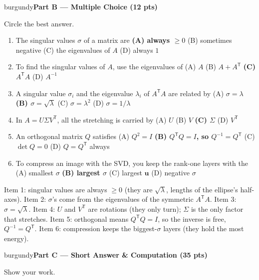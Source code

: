 \documentclass[10pt]{article}
\newcommand{\uu}{\mathbf{u}}
\newcommand{\T}{^{\mathsf T}}
\newcommand{\parthead}[1]{%
  \vspace{6pt}\noindent
  \begin{headlinebox}{burgundy}{\color{white}\bfseries #1}\end{headlinebox}%
  \vspace{4pt}}
\begin{document}
\parthead{Part B --- Multiple Choice (12 pts)}
Circle the best answer.

\begin{enumerate}[leftmargin=1.9em, itemsep=9pt]
  \item The singular values $\sigma$ of a matrix are
    \hfill \textbf{(A) always $\ge0$} \ans{$\leftarrow$} \quad (B) sometimes negative \quad (C) the eigenvalues of $A$ \quad (D) always $1$
  \item To find the singular values of $A$, use the eigenvalues of
    \hfill (A) $A$ \quad (B) $A+A\T$ \quad \textbf{(C) $A\T A$} \ans{$\leftarrow$} \quad (D) $A^{-1}$
  \item A singular value $\sigma_i$ and the eigenvalue $\lambda_i$ of $A\T A$ are related by
    \hfill (A) $\sigma=\lambda$ \quad \textbf{(B) $\sigma=\sqrt{\lambda}$} \ans{$\leftarrow$} \quad (C) $\sigma=\lambda^2$ \quad (D) $\sigma=1/\lambda$
  \item In $A=U\Sigma V\T$, all the stretching is carried by
    \hfill (A) $U$ \quad (B) $V$ \quad \textbf{(C) $\Sigma$} \ans{$\leftarrow$} \quad (D) $V\T$
  \item An orthogonal matrix $Q$ satisfies
    \hfill (A) $Q^2=I$ \quad \textbf{(B) $Q\T Q=I$, so $Q^{-1}=Q\T$} \ans{$\leftarrow$} \quad (C) $\det Q=0$ \quad (D) $Q=Q\T$ always
  \item To compress an image with the SVD, you keep the rank-one layers with the
    \hfill (A) smallest $\sigma$ \quad \textbf{(B) largest $\sigma$} \ans{$\leftarrow$} \quad (C) largest $\uu$ \quad (D) negative $\sigma$
\end{enumerate}

\begin{teachernote}
Item 1: singular values are always $\ge0$ (they are $\sqrt{\lambda}$, lengths of the ellipse's half-axes). Item 2:
$\sigma$'s come from the eigenvalues of the symmetric $A\T A$. Item 3: $\sigma=\sqrt{\lambda}$. Item 4: $U$ and $V\T$ are
rotations (they only turn); $\Sigma$ is the only factor that stretches. Item 5: orthogonal means $Q\T Q=I$, so the
inverse is free, $Q^{-1}=Q\T$. Item 6: compression keeps the biggest-$\sigma$ layers (they hold the most energy).
\end{teachernote}

\parthead{Part C --- Short Answer \& Computation (35 pts)}
Show your work.
\end{document}
